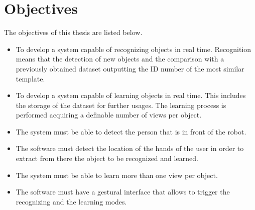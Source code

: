\section{Objectives}
\label{objectives}

The objectives of this thesis are listed below. 

\begin{itemize}
	\item To develop a system capable of recognizing objects in real time. 
			Recognition means that the detection of new objects and the comparison with a previously obtained dataset outputting the ID number of the most similar template.
	\item To develop a system capable of learning objects in real time. 
			This includes the storage of the dataset for further usages.
			The learning process is performed acquiring a definable number of views per object. 
	\item The system must be able to detect the person that is in front of the robot. 
	\item The software must detect the location of the hands of the user in order to extract from there the object to be recognized and learned. 
	\item The system must be able to learn more than one view per object. 
	\item The software must have a gestural interface that allows to trigger the recognizing and the learning modes. 

\end{itemize}
\\




